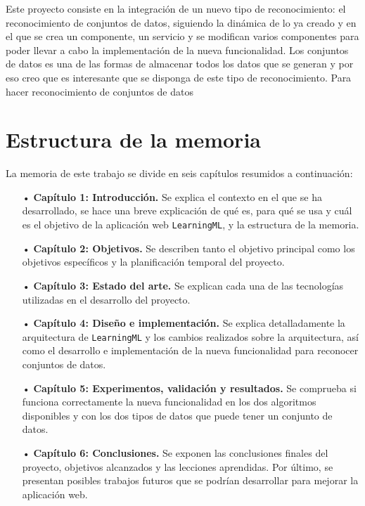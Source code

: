 \documentclass[a4paper, 12pt]{book}
\begin{document}
Este proyecto consiste en la integración de un nuevo tipo de reconocimiento: el reconocimiento de conjuntos de datos, siguiendo la dinámica de lo ya creado y en el que se crea un componente, un servicio y se modifican varios componentes para poder llevar a cabo la implementación de la nueva funcionalidad. 
Los conjuntos de datos es una de las formas de almacenar todos los datos que se generan y por eso creo que es interesante que se disponga de este tipo de reconocimiento. Para hacer reconocimiento de conjuntos de datos 


\section{Estructura de la memoria}
\label{sec:estructura}

La memoria de este trabajo se divide en seis capítulos resumidos a continuación:

\begin{itemize}
  \item[•] \textbf{Capítulo 1: Introducción.} Se explica el contexto en el que se ha desarrollado, se hace una breve explicación de qué es, para qué se usa y cuál es el objetivo de la aplicación web \texttt{LearningML}, y la estructura de la memoria.
  
  \item[•] \textbf{Capítulo 2: Objetivos.} Se describen tanto el objetivo principal como los objetivos específicos y la planificación temporal del proyecto.
  
  \item[•] \textbf{Capítulo 3: Estado del arte.} Se explican cada una de las tecnologías utilizadas en el desarrollo del proyecto.
  
  \item[•] \textbf{Capítulo 4: Diseño e implementación.} Se explica detalladamente la arquitectura de \texttt{LearningML} y los cambios realizados sobre la arquitectura, así como el desarrollo e implementación de la nueva funcionalidad para reconocer conjuntos de datos.
  
  \item[•] \textbf{Capítulo 5: Experimentos, validación y resultados.} Se comprueba si funciona correctamente la nueva funcionalidad en los dos algoritmos disponibles y con los dos tipos de datos que puede tener un conjunto de datos.
  
  \item[•] \textbf{Capítulo 6: Conclusiones.} Se exponen las conclusiones finales del proyecto, objetivos alcanzados y las lecciones aprendidas. Por último, se presentan posibles trabajos futuros que se podrían desarrollar para mejorar la aplicación web.
  
\end{itemize}
\end{document}
